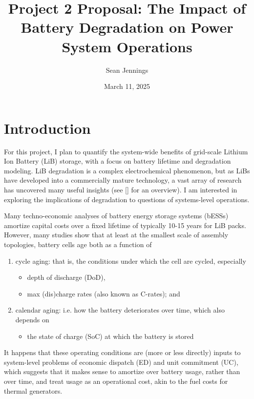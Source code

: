 \documentclass{homework}
\title{Project 2 Proposal: The Impact of Battery Degradation on Power System Operations}
\author{Sean Jennings}
\date{March 11, 2025}
\begin{document}
\maketitle

\section{Introduction}

For this project, I plan to quantify the system-wide benefits of grid-scale Lithium Ion Battery (LiB) storage, with a focus on battery lifetime and degradation modeling.
LiB degradation is a complex electrochemical phenomenon, but as LiBs have developed into a commercially mature technology, a vast array of research has uncovered
many useful insights (see [] for an overview). I am interested in exploring the implications of degradation to questions of systems-level operations.

Many techno-economic analyses of battery energy storage systems (bESSs) amortize capital costs over a fixed lifetime of typically 10-15 years for LiB packs. However,
many studies show that at least at the smallest scale of assembly topologies, battery cells age both as a function of
\begin{enumerate}
    \item cycle aging: that is, the conditions under which the cell are cycled, especially
    \begin{itemize}
        \item depth of discharge (DoD),
        \item max (dis)charge rates (also known as C-rates); and
    \end{itemize}
    \item calendar aging: i.e. how the battery deteriorates over time, which also depends on
    \begin{itemize}
        \item the state of charge (SoC) at which the battery is stored
    \end{itemize}
\end{enumerate} 

It happens that these operating conditions are (more or less directly) inputs to system-level problems of economic dispatch (ED) and unit commitment (UC), which suggests that
it makes sense to amortize over battery usage, rather than over time, and treat usage as an operational cost, akin to the fuel costs for thermal generators.
\end{document}
